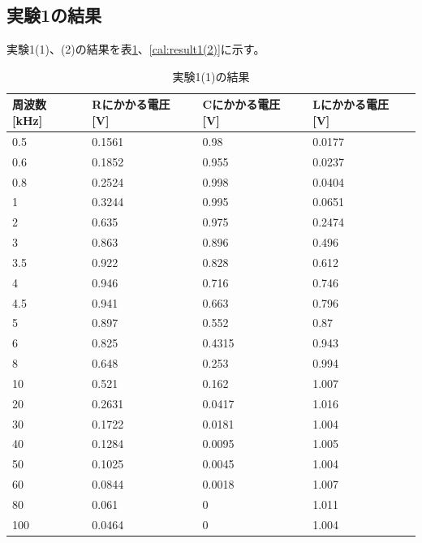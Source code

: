 \documentclass[11pt,a4paper,fleqn]{jsarticle}
\begin{document}
\subsection{実験1の結果}
実験1(1)、(2)の結果を表\ref{cal:result1(1)}、\ref{cal:result1(2)}に示す。
\begin{table}[!h]
\centering
\caption{実験1(1)の結果}
\label{cal:result1(1)}
\begin{tabular}{|l|l|l|l|}
\hline
周波数 {[}kHz{]} & Rにかかる電圧 {[}V{]} & Cにかかる電圧 {[}V{]} & Lにかかる電圧 {[}V{]} \\ \hline \hline
0.5           & 0.1561          & 0.98            & 0.0177          \\ \hline
0.6           & 0.1852          & 0.955           & 0.0237          \\ \hline
0.8           & 0.2524          & 0.998           & 0.0404          \\ \hline
1             & 0.3244          & 0.995           & 0.0651          \\ \hline
2             & 0.635           & 0.975           & 0.2474          \\ \hline
3             & 0.863           & 0.896           & 0.496           \\ \hline
3.5           & 0.922           & 0.828           & 0.612           \\ \hline
4             & 0.946           & 0.716           & 0.746           \\ \hline
4.5           & 0.941           & 0.663           & 0.796           \\ \hline
5             & 0.897           & 0.552           & 0.87            \\ \hline
6             & 0.825           & 0.4315          & 0.943           \\ \hline
8             & 0.648           & 0.253           & 0.994           \\ \hline
10            & 0.521           & 0.162           & 1.007           \\ \hline
20            & 0.2631          & 0.0417          & 1.016           \\ \hline
30            & 0.1722          & 0.0181          & 1.004           \\ \hline
40            & 0.1284          & 0.0095          & 1.005           \\ \hline
50            & 0.1025          & 0.0045          & 1.004           \\ \hline
60            & 0.0844          & 0.0018          & 1.007           \\ \hline
80            & 0.061           & 0               & 1.011           \\ \hline
100           & 0.0464          & 0               & 1.004           \\ \hline
\end{tabular}
\end{table}
\end{document}
